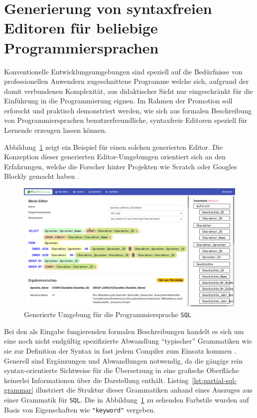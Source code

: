 \documentclass[paper=a4,fontsize=12pt,parskip=half]{scrartcl}
\begin{document}
\section{Generierung von syntaxfreien Editoren für beliebige Programmiersprachen}

Konventionelle Entwicklungsumgebungen sind speziell auf die Bedürfnisse von professionellen Anwendern zugeschnittene Programme welche sich, aufgrund der damit verbundenen Komplexität, aus didaktischer Sicht nur eingeschränkt für die Einführung in die Programmierung eignen. Im Rahmen der Promotion soll erforscht und praktisch demonstriert werden, wie sich aus formalen Beschreibung von Programmiersprachen benutzerfreundliche, syntaxfreie Editoren speziell für Lernende erzeugen lassen können.

Abbildung~\ref{fig:example-sql-ide} zeigt ein Beispiel für einen solchen generierten Editor. Die Konzeption dieser generierten Editor-Umgebungen orientiert sich an den Erfahrungen, welche die Forscher hinter Projekten wie Scratch \cite{resnick_scratch:_2009} oder Googles Blockly gemacht haben \cite{fraser_ten_2015}.



\begin{figure}[p]
  \includegraphics[width=\linewidth]{screenshot-drag-drop-ide.png}
  \caption{Generierte Umgebung für die Programmiersprache \texttt{SQL}}
  \label{fig:example-sql-ide}
\end{figure}

Bei den als Eingabe fungierenden formalen Beschreibungen handelt es sich um eine noch nicht endgültig spezifizierte Abwandlung \enquote{typischer} Grammatiken wie sie zur Definition der Syntax in fast jedem Compiler zum Einsatz kommen \cite[S. 42ff]{aho_compilers:_2007}. Generell sind Ergänzungen und Abwandlungen notwendig, da die gängige rein syntax-orientierte Sichtweise für die Übersetzung in eine grafische Oberfläche keinerlei Informationen über die Darstellung enthält. Listing~\ref{lst:partial-sql-grammar} illustriert die Struktur dieser Grammatiken anhand eines Auszuges aus einer Grammatik für \texttt{SQL}. Die in Abbildung~\ref{fig:example-sql-ide} zu sehenden Farbstile wurden auf Basis von Eigenschaften wie \texttt{"keyword"} vergeben.
\end{document}
